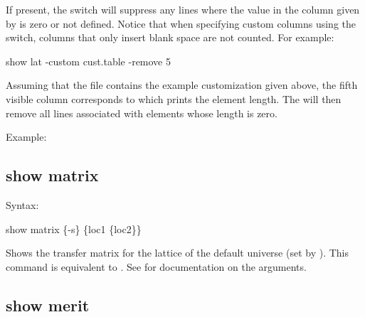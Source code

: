 {{{{{If present, the  switch will suppress any lines where
the value in the column given by  is zero or not defined. Notice that when
specifying custom columns using the  switch, columns that only insert blank
space are not counted. For example:
\begin{example}
  show lat -custom cust.table -remove 5
\end{example}
Assuming that the file  contains the example customization given above, the
fifth visible column corresponds to  which prints the element length. The
 will then remove all lines associated with elements whose length is zero.

Example:


\subsection{show matrix}
\label{s:show.matrix}

Syntax:
\begin{example}
  show matrix \{-s\} \{loc1 \{loc2\}\}
\end{example}


Shows the transfer matrix for the  lattice of the default universe (set by
).  This command is equivalent to . See  for documentation on the  arguments.


\subsection{show merit}
\label{s:show.merit}

}}}}}
